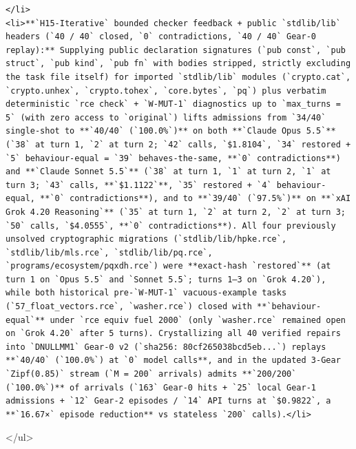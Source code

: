 \documentclass[10pt,letterpaper]{article}
\begin{document}
\begin{itemize}
\begin{verbatim}
</li>
<li>**`H15-Iterative` bounded checker feedback + public `stdlib/lib` headers (`40 / 40` closed, `0` contradictions, `40 / 40` Gear-0 replay):** Supplying public declaration signatures (`pub const`, `pub struct`, `pub kind`, `pub fn` with bodies stripped, strictly excluding the task file itself) for imported `stdlib/lib` modules (`crypto.cat`, `crypto.unhex`, `crypto.tohex`, `core.bytes`, `pq`) plus verbatim deterministic `rce check` + `W-MUT-1` diagnostics up to `max_turns = 5` (with zero access to `original`) lifts admissions from `34/40` single-shot to **`40/40` (`100.0%`)** on both **`Claude Opus 5.5`** (`38` at turn 1, `2` at turn 2; `42` calls, `$1.8104`, `34` restored + `5` behaviour-equal = `39` behaves-the-same, **`0` contradictions**) and **`Claude Sonnet 5.5`** (`38` at turn 1, `1` at turn 2, `1` at turn 3; `43` calls, **`$1.1122`**, `35` restored + `4` behaviour-equal, **`0` contradictions**), and to **`39/40` (`97.5%`)** on **`xAI Grok 4.20 Reasoning`** (`35` at turn 1, `2` at turn 2, `2` at turn 3; `50` calls, `$4.0555`, **`0` contradictions**). All four previously unsolved cryptographic migrations (`stdlib/lib/hpke.rce`, `stdlib/lib/mls.rce`, `stdlib/lib/pq.rce`, `programs/ecosystem/pqxdh.rce`) were **exact-hash `restored`** (at turn 1 on `Opus 5.5` and `Sonnet 5.5`; turns 1–3 on `Grok 4.20`), while both historical pre-`W-MUT-1` vacuous-example tasks (`57_float_vectors.rce`, `washer.rce`) closed with **`behaviour-equal`** under `rce equiv fuel 2000` (only `washer.rce` remained open on `Grok 4.20` after 5 turns). Crystallizing all 40 verified repairs into `DNULLMM1` Gear-0 v2 (`sha256: 80cf265038bcd5eb...`) replays **`40/40` (`100.0%`) at `0` model calls**, and in the updated 3-Gear `Zipf(0.85)` stream (`M = 200` arrivals) admits **`200/200` (`100.0%`)** of arrivals (`163` Gear-0 hits + `25` local Gear-1 admissions + `12` Gear-2 episodes / `14` API turns at `$0.9822`, a **`16.67×` episode reduction** vs stateless `200` calls).</li>
\end{verbatim}

  \textless/ul\textgreater{}
\end{itemize}
\end{document}
